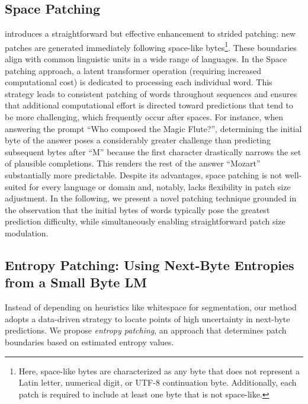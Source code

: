 \subsection{Space Patching}
\label{section:white-patch}

\citet{slagle2024spacebyte} introduces a straightforward but effective enhancement to strided patching: new patches are generated immediately following space-like bytes\footnote{
    Here, space-like bytes are characterized as any byte that does not represent a Latin letter, numerical digit, or UTF-8 continuation byte. Additionally, each patch is required to include at least one byte that is not space-like.}. These boundaries align with common linguistic units in a wide range of languages. In the Space patching approach, a latent transformer operation (requiring increased computational cost) is dedicated to processing each individual word. This strategy leads to consistent patching of words throughout sequences and ensures that additional computational effort is directed toward predictions that tend to be more challenging, which frequently occur after spaces. For instance, when answering the prompt ``Who composed the Magic Flute?\uline{\hspace{.6em}}'', determining the initial byte of the answer poses a considerably greater challenge than predicting subsequent bytes after ``M'' because the first character drastically narrows the set of plausible completions. This renders the rest of the answer ``Mozart'' substantially more predictable. Despite its advantages, space patching is not well-suited for every language or domain and, notably, lacks flexibility in patch size adjustment. In the following, we present a novel patching technique grounded in the observation that the initial bytes of words typically pose the greatest prediction difficulty, while simultaneously enabling straightforward patch size modulation.

\subsection{Entropy Patching: Using Next-Byte Entropies from a Small Byte LM}
\label{section:dyn-patch}

Instead of depending on heuristics like whitespace for segmentation, our method adopts a data-driven strategy to locate points of high uncertainty in next-byte predictions. We propose \textit{entropy patching}, an approach that determines patch boundaries based on estimated entropy values.

